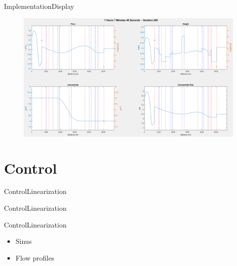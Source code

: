 \begin{frame}{Implementation}{Display}
     \begin{figure}[h]
 \centering
 \includegraphics[width=1.0 \textwidth]{figures/display_result_matlab.png}
 \caption{%
 }
 \label{fig:display_result_matlab}
 \end{figure}
\end{frame}


\section{Control}
\begin{frame}{Control}{Linearization}
    


\end{frame}
\begin{frame}{Control}{Linearization}
    


\end{frame}
\begin{frame}{Control}{Linearization}
    \begin{minipage}[t]{0.48\linewidth}
\begin{itemize}
	   	\item Sinus
	   	\item Flow profiles 
\end{itemize}    
\end{minipage}\hfill
\begin{minipage}[t]{0.48\linewidth}


\end{minipage}


\end{frame}

